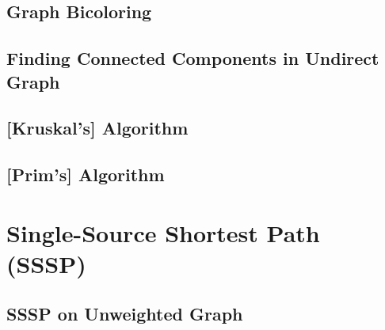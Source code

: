	\subsection {Graph Bicoloring}
	  
	\subsection {Finding Connected Components in Undirect Graph}
		
	\subsection {[Kruskal's] Algorithm}
        
	\subsection {[Prim's] Algorithm}
        
\section {Single-Source Shortest Path (SSSP)}
	\subsection {SSSP on Unweighted Graph}
		
